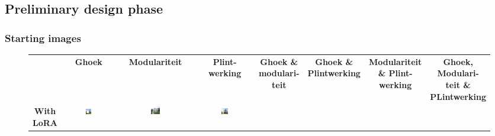 \subsection{Preliminary design phase}
\subsubsection{Starting images}
\begin{figure}[H]
  \centering
  {\footnotesize
  \renewcommand{\arraystretch}{1.1}
  \setlength{\tabcolsep}{4pt}
  \begin{tabular}{c c c c c c c c}
    & \textbf{Ghoek} & \textbf{Modulariteit} & \shortstack{\textbf{Plint-}\\\textbf{werking}}
    & \shortstack{\textbf{Ghoek \&}\\ \textbf{modulari-}\\\textbf{teit}} 
    & \shortstack{\textbf{Ghoek \&}\\ \textbf{Plintwerking}} 
    & \shortstack{\textbf{Modulariteit} \\ \textbf{ \& Plint-}\\\textbf{werking}} 
    & \shortstack{\textbf{Ghoek,}\\\textbf{Modulari-}\\\textbf{teit \&}\\\textbf{PLintwerking}} \\
    \shortstack{\textbf{With}\\\textbf{LoRA}} & 
    \href{https://github.com/matijspeeters/Thesis/blob/main/Images/Results/Architect-B_Fixed-images/2-preliminary_design/Met_lora_00027_.png}{\includegraphics[width=0.12\textwidth]{Images/Results/Architect-B_Fixed-images/2-preliminary_design/Met_lora_00027_.png}} & 
    \href{https://github.com/matijspeeters/Thesis/blob/main/Images/Results/Architect-B_Fixed-images/2-preliminary_design/Met_lora_00028_.png}{\includegraphics[width=0.12\textwidth]{Images/Results/Architect-B_Fixed-images/2-preliminary_design/Met_lora_00028_.png}} &
    \href{https://github.com/matijspeeters/Thesis/blob/main/Images/Results/Architect-B_Fixed-images/2-preliminary_design/Met_lora_00030_.png}{\includegraphics[width=0.12\textwidth]{Images/Results/Architect-B_Fixed-images/2-preliminary_design/Met_lora_00030_.png}} &

\end{tabular}}
\end{figure}
